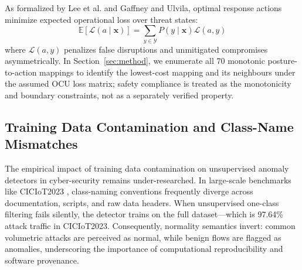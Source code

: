 \documentclass[journal,10pt,onecolumn]{IEEEtran}
\begin{document}
As formalized by Lee et al. and Gaffney and Ulvila, optimal response actions minimize expected operational loss over threat states:
$$\mathbb{E}[\mathcal{L}(a \mid \mathbf{x})] = \sum_{y \in \mathcal{Y}} P(y \mid \mathbf{x}) \mathcal{L}(a, y)$$
where $\mathcal{L}(a, y)$ penalizes false disruptions and unmitigated compromises asymmetrically. In Section~\ref{sec:method}, we enumerate all 70 monotonic posture-to-action mappings to identify the lowest-cost mapping and its neighbours under the assumed OCU loss matrix; safety compliance is treated as the monotonicity and boundary constraints, not as a separately verified property.

\subsection{Training Data Contamination and Class-Name Mismatches}
The empirical impact of training data contamination on unsupervised anomaly detectors in cyber-security remains under-researched. In large-scale benchmarks like CICIoT2023 \cite{3}, class-naming conventions frequently diverge across documentation, scripts, and raw data headers. When unsupervised one-class filtering fails silently, the detector trains on the full dataset---which is 97.64\% attack traffic in CICIoT2023. Consequently, normality semantics invert: common volumetric attacks are perceived as normal, while benign flows are flagged as anomalies, underscoring the importance of computational reproducibility and software provenance.
\end{document}
